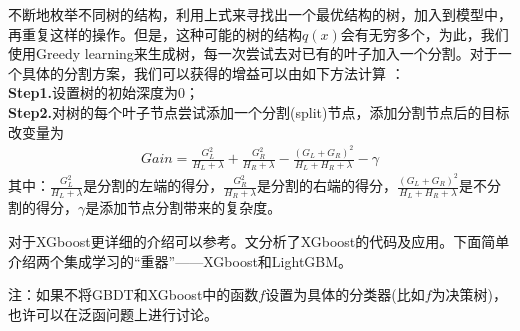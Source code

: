           \par
          不断地枚举不同树的结构，利用上式来寻找出一个最优结构的树，加入到模型中，再重复这样的操作。但是，这种可能的树的结构$q(x)$会有无穷多个，为此，我们使用Greedy learning来生成树，每一次尝试去对已有的叶子加入一个分割。对于一个具体的分割方案，我们可以获得的增益可以由如下方法计算
          ：\\
          \textbf{Step1.}设置树的初始深度为0；\\
          \textbf{Step2.}对树的每个叶子节点尝试添加一个分割(split)节点，添加分割节点后的目标改变量为
          \begin{align*}
          Gain = \frac{G_L^2}{H_L+\lambda}+\frac{G_R^2}{H_R+\lambda} -\frac{(G_L+G_R)^2}{H_L+H_R+\lambda} - \gamma
          \end{align*}
          其中：$\frac{G_L^2}{H_L+\lambda}$是分割的左端的得分，$\frac{G_R^2}{H_R+\lambda}$是分割的右端的得分，$\frac{(G_L+G_R)^2}{H_L+H_R+\lambda}$是不分割的得分，$\gamma$是添加节点分割带来的复杂度。
          \par
          对于XGboost更详细的介绍可以参考\cite{2016.Tianqi}\cite{2016.Didrik}。文\cite{Wang.2016}分析了XGboost的代码及应用。下面简单介绍两个集成学习的“重器”——XGboost和LightGBM。
          \par
          注：如果不将GBDT和XGboost中的函数$f$设置为具体的分类器(比如$f$为决策树)，也许可以在泛函问题上进行讨论。
